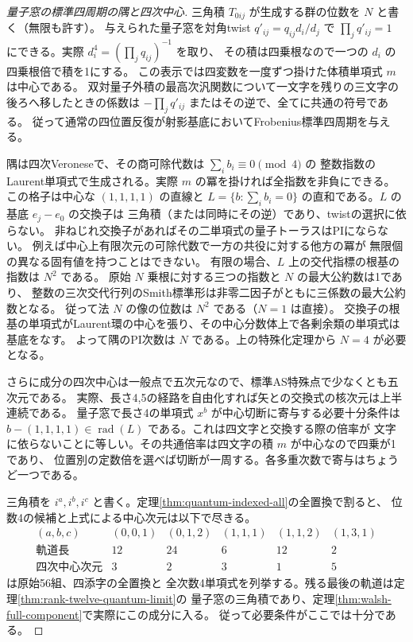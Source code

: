 \begin{proof}[量子窓の標準四周期の隅と四次中心]
三角積 $T_{0ij}$ が生成する群の位数を $N$ と書く（無限も許す）。
与えられた量子窓を対角twist $q'_{ij}=q_{ij}d_i/d_j$ で
$\prod_jq'_{ij}=1$ にできる。実際 $d_i^4=(\prod_jq_{ij})^{-1}$ を取り、
その積は四乗根なので一つの $d_i$ の四乗根倍で積を1にする。
この表示では四変数を一度ずつ掛けた体積単項式 $m$ は中心である。
双対量子外積の最高次汎関数について一文字を残りの三文字の後ろへ移したときの係数は
$-\prod_jq'_{ij}$ またはその逆で、全てに共通の符号である。
従って通常の四位置反復が射影基底においてFrobenius標準四周期を与える。

隅は四次Veroneseで、その商可除代数は $\sum_i b_i\equiv0\pmod4$ の
整数指数のLaurent単項式で生成される。実際 $m$ の冪を掛ければ全指数を非負にできる。
この格子は中心な $(1,1,1,1)$ の直線と
$L=\{b:\sum_i b_i=0\}$ の直和である。$L$ の基底 $e_j-e_0$ の交換子は
三角積（または同時にその逆）であり、twistの選択に依らない。
非ねじれ交換子があればその二単項式の量子トーラスはPIにならない。
例えば中心上有限次元の可除代数で一方の共役に対する他方の冪が
無限個の異なる固有値を持つことはできない。
有限の場合、$L$ 上の交代指標の根基の指数は $N^2$ である。
原始 $N$ 乗根に対する三つの指数と $N$ の最大公約数は1であり、
整数の三次交代行列のSmith標準形は非零二因子がともに三係数の最大公約数となる。
従って法 $N$ の像の位数は $N^2$ である（$N=1$ は直接）。
交換子の根基の単項式がLaurent環の中心を張り、その中心分数体上で各剰余類の単項式は基底をなす。
よって隅のPI次数は $N$ である。上の特殊化定理から $N=4$ が必要となる。

さらに成分の四次中心は一般点で五次元なので、標準AS特殊点で少なくとも五次元である。
実際、長さ4,5の経路を自由化すれば矢との交換式の核次元は上半連続である。
量子窓で長さ4の単項式 $x^b$ が中心切断に寄与する必要十分条件は
$b-(1,1,1,1)\in\operatorname{rad}(L)$ である。これは四文字と交換する際の倍率が
文字に依らないことに等しい。その共通倍率は四文字の積 $m$ が中心なので四乗が1であり、
位置別の定数倍を選べば切断が一周する。各多重次数で寄与はちょうど一つである。

三角積を $i^a,i^b,i^c$ と書く。定理\ref{thm:quantum-indexed-all}の全置換で割ると、
位数4の候補と上式による中心次元は以下で尽きる。
\[
\begin{array}{c|ccccc}
 (a,b,c)&(0,0,1)&(0,1,2)&(1,1,1)&(1,1,2)&(1,3,1)\\\hline
 \text{軌道長}&12&24&6&12&2\\
 \text{四次中心次元}&3&2&3&1&5
\end{array}
\]
 は原始56組、四添字の全置換と
全次数4単項式を列挙する。残る最後の軌道は定理\ref{thm:rank-twelve-quantum-limit}の
量子窓の三角積であり、定理\ref{thm:walsh-full-component}で実際にこの成分に入る。
従って必要条件がここでは十分である。
\end{proof}
